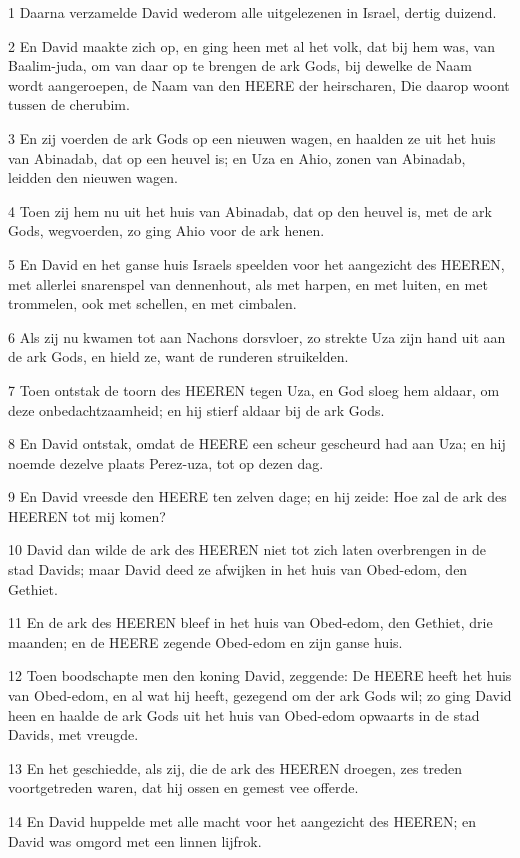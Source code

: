 \par 1 Daarna verzamelde David wederom alle uitgelezenen in Israel, dertig duizend.
\par 2 En David maakte zich op, en ging heen met al het volk, dat bij hem was, van Baalim-juda, om van daar op te brengen de ark Gods, bij dewelke de Naam wordt aangeroepen, de Naam van den HEERE der heirscharen, Die daarop woont tussen de cherubim.
\par 3 En zij voerden de ark Gods op een nieuwen wagen, en haalden ze uit het huis van Abinadab, dat op een heuvel is; en Uza en Ahio, zonen van Abinadab, leidden den nieuwen wagen.
\par 4 Toen zij hem nu uit het huis van Abinadab, dat op den heuvel is, met de ark Gods, wegvoerden, zo ging Ahio voor de ark henen.
\par 5 En David en het ganse huis Israels speelden voor het aangezicht des HEEREN, met allerlei snarenspel van dennenhout, als met harpen, en met luiten, en met trommelen, ook met schellen, en met cimbalen.
\par 6 Als zij nu kwamen tot aan Nachons dorsvloer, zo strekte Uza zijn hand uit aan de ark Gods, en hield ze, want de runderen struikelden.
\par 7 Toen ontstak de toorn des HEEREN tegen Uza, en God sloeg hem aldaar, om deze onbedachtzaamheid; en hij stierf aldaar bij de ark Gods.
\par 8 En David ontstak, omdat de HEERE een scheur gescheurd had aan Uza; en hij noemde dezelve plaats Perez-uza, tot op dezen dag.
\par 9 En David vreesde den HEERE ten zelven dage; en hij zeide: Hoe zal de ark des HEEREN tot mij komen?
\par 10 David dan wilde de ark des HEEREN niet tot zich laten overbrengen in de stad Davids; maar David deed ze afwijken in het huis van Obed-edom, den Gethiet.
\par 11 En de ark des HEEREN bleef in het huis van Obed-edom, den Gethiet, drie maanden; en de HEERE zegende Obed-edom en zijn ganse huis.
\par 12 Toen boodschapte men den koning David, zeggende: De HEERE heeft het huis van Obed-edom, en al wat hij heeft, gezegend om der ark Gods wil; zo ging David heen en haalde de ark Gods uit het huis van Obed-edom opwaarts in de stad Davids, met vreugde.
\par 13 En het geschiedde, als zij, die de ark des HEEREN droegen, zes treden voortgetreden waren, dat hij ossen en gemest vee offerde.
\par 14 En David huppelde met alle macht voor het aangezicht des HEEREN; en David was omgord met een linnen lijfrok.
